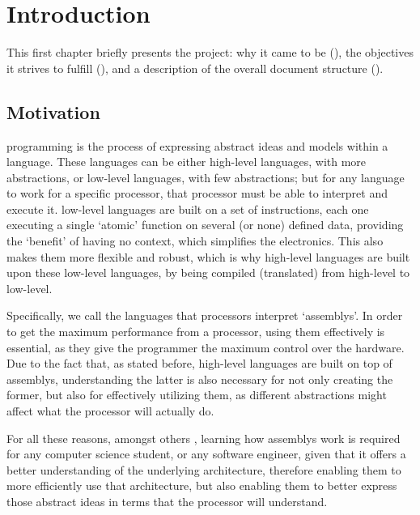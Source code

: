 \chapter{Introduction}\label{chap:introduction}
This first chapter briefly presents the project: why it came to be (), the objectives it strives to fulfill (), and a description of the overall document structure ().


\section{Motivation}\label{sec:motivation}
\Gls{programming} is the process of expressing abstract ideas and models within a language. These languages can be either \glspl{high-level language}, with more abstractions, or \glspl{low-level language}, with few abstractions; but for any language to work for a specific \gls{processor}, that \gls{processor} must be able to interpret and execute it. \Glspl{low-level language} are built on a set of instructions, each one executing a single `atomic' function on several (or none) defined data, providing the `benefit' of having no context, which simplifies the electronics. This also makes them more flexible and robust, which is why \glspl{high-level language} are built upon these \glspl{low-level language}, by being compiled (translated) from high-level to low-level.

Specifically, we call  the languages that processors interpret `\glspl{assembly}'. In order to get the maximum performance from a \gls{processor}, using them effectively is essential, as they give the \gls{programmer} the maximum control over the hardware. Due to the fact that, as stated before, \glspl{high-level language} are built on top of \glspl{assembly}, understanding the latter is also necessary for not only creating the former, but also for effectively utilizing them, as different abstractions might affect what the \gls{processor} will actually do.

For all these reasons, amongst others \supercite{jorgensen2019x86}, learning how \glspl{assembly} work is required for any \gls{computer science} student, or any \gls{software engineer}, given that it offers a better understanding of the underlying architecture, therefore enabling them to more efficiently use that architecture, but also enabling them to better express those abstract ideas in terms that the \gls{processor} will understand.


